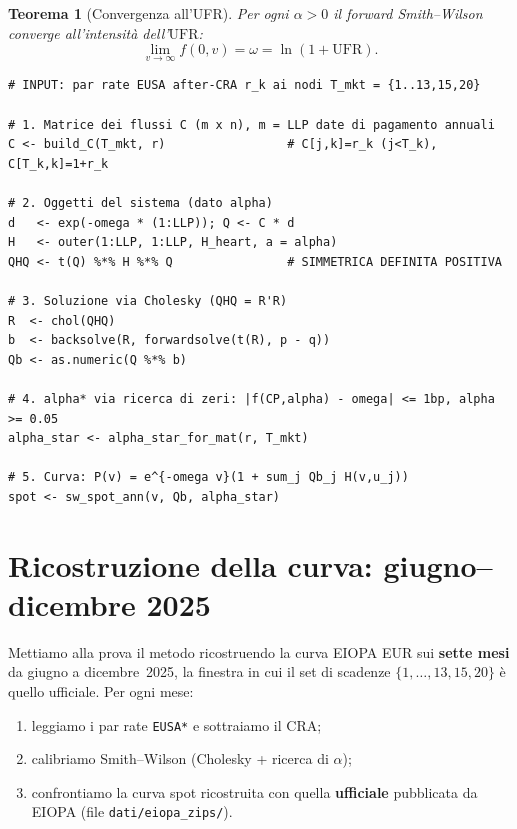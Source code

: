\documentclass[11pt,a4paper]{article}
\theoremstyle{plain}
\newtheorem{teorema}{Teorema}[section]
\theoremstyle{definition}
\theoremstyle{remark}
\newcommand{\UFR}{\ensuremath{\mathrm{UFR}}}
\newcommand{\CRA}{\ensuremath{\mathrm{CRA}}}
\begin{document}
\begin{teorema}[Convergenza all'UFR]
\label{thm:convergenza}
Per ogni $\alpha>0$ il forward Smith--Wilson converge all'intensit\`a dell'$\UFR$:
\[
  \lim_{v\to\infty} f(0,v) = \omega = \ln(1+\UFR).
\]
\end{teorema}

\begin{algobox}
\begin{Verbatim}[fontsize=\small]
# INPUT: par rate EUSA after-CRA r_k ai nodi T_mkt = {1..13,15,20}

# 1. Matrice dei flussi C (m x n), m = LLP date di pagamento annuali
C <- build_C(T_mkt, r)                 # C[j,k]=r_k (j<T_k), C[T_k,k]=1+r_k

# 2. Oggetti del sistema (dato alpha)
d   <- exp(-omega * (1:LLP)); Q <- C * d
H   <- outer(1:LLP, 1:LLP, H_heart, a = alpha)
QHQ <- t(Q) %*% H %*% Q                # SIMMETRICA DEFINITA POSITIVA

# 3. Soluzione via Cholesky (QHQ = R'R)
R  <- chol(QHQ)
b  <- backsolve(R, forwardsolve(t(R), p - q))
Qb <- as.numeric(Q %*% b)

# 4. alpha* via ricerca di zeri: |f(CP,alpha) - omega| <= 1bp, alpha >= 0.05
alpha_star <- alpha_star_for_mat(r, T_mkt)

# 5. Curva: P(v) = e^{-omega v}(1 + sum_j Qb_j H(v,u_j))
spot <- sw_spot_ann(v, Qb, alpha_star)
\end{Verbatim}
\end{algobox}

\section{Ricostruzione della curva: giugno--dicembre 2025}
\label{sec:ricostruzione}

Mettiamo alla prova il metodo ricostruendo la curva EIOPA EUR sui \textbf{sette mesi} da
giugno a dicembre~2025, la finestra in cui il set di scadenze $\{1,\dots,13,15,20\}$ \`e quello
ufficiale. Per ogni mese:
\begin{enumerate}
  \item leggiamo i par rate \texttt{EUSA*} e sottraiamo il $\CRA$;
  \item calibriamo Smith--Wilson (Cholesky + ricerca di $\alpha$);
  \item confrontiamo la curva spot ricostruita con quella \textbf{ufficiale} pubblicata da
        EIOPA (file \texttt{dati/eiopa\_zips/}).
\end{enumerate}
\end{document}
